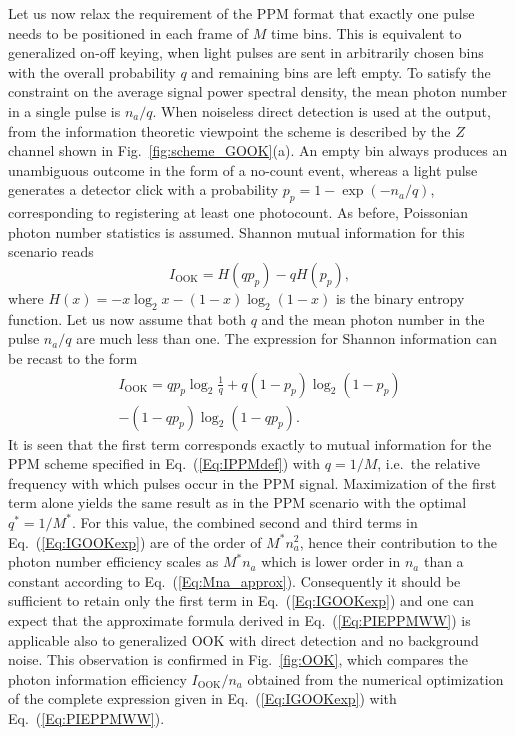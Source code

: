 \documentclass[conference]{IEEEtran}
\newcommand{\optval}[1]{#1^\ast}
\newcommand{\ookpulseprob}{q}
\begin{document}
Let us now relax the requirement of the PPM format that exactly one pulse needs to be positioned in each frame of $M$ time bins. This is equivalent to generalized on-off keying, when light pulses are sent in arbitrarily chosen bins with the overall probability $\ookpulseprob$ and remaining bins are left empty. To satisfy the constraint on the average signal power spectral density, the mean photon number in a single pulse is $n_a/\ookpulseprob$. When noiseless direct detection is used at the output,  from the information theoretic viewpoint the scheme is described by the  $Z$ channel shown in Fig.~\ref{fig:scheme_GOOK}(a). An empty bin always produces an unambiguous outcome in the form of a no-count event, whereas a light pulse generates a detector click with a probability $p_p = 1-\exp(-n_a/\ookpulseprob)$, corresponding to registering at least one photocount. As before, Poissonian photon number statistics is assumed. Shannon mutual information for this scenario reads
\begin{equation}
I_{\text{OOK}} = H(\ookpulseprob p_p ) - \ookpulseprob H(p_p),
\label{Eq:IGOOKdef}
\end{equation}
where $H(x) =  - x \log_2 x - (1-x) \log_2 (1-x)$ is the binary entropy function. Let us now assume that both $\ookpulseprob$ and the mean photon number in the pulse $n_a/\ookpulseprob$ are much less than one. The expression for Shannon information can be recast to the form
\begin{multline}
I_{\text{OOK}} = \ookpulseprob p_p \log_2 \frac{1}{\ookpulseprob} + \ookpulseprob (1-p_p) \log_2 (1-p_p) \\
- (1- \ookpulseprob p_p) \log_2 (1- \ookpulseprob p_p).
\label{Eq:IGOOKexp}
\end{multline}
It is seen that the first term corresponds exactly to mutual information for the PPM scheme specified in Eq.~(\ref{Eq:IPPMdef}) with $\ookpulseprob = 1/M$, i.e.\ the relative frequency with which pulses occur in the PPM signal.
Maximization of the first term alone yields the same result as in the PPM scenario with the optimal $\optval{q} = 1/\optval{M}$. For this value, the combined second and third terms in Eq.~(\ref{Eq:IGOOKexp}) are of the order of $\optval{M} n_a^2$, hence their contribution to the photon number efficiency scales as $\optval{M} n_a$ which is lower order in $n_a$ than a constant according to Eq.~(\ref{Eq:Mna_approx}). Consequently it should be sufficient to retain only the first term in Eq.~(\ref{Eq:IGOOKexp}) and one can expect that the approximate formula derived in Eq.~(\ref{Eq:PIEPPMWW}) is applicable also to generalized OOK with direct detection and no background noise. This observation is confirmed in Fig.~\ref{fig:OOK}, which compares the photon information efficiency $I_{\text{OOK}}/n_a$ obtained from the numerical optimization of the complete expression given in Eq.~(\ref{Eq:IGOOKexp}) with Eq.~(\ref{Eq:PIEPPMWW}).
\end{document}
